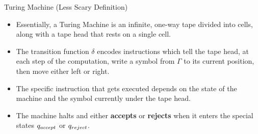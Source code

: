 \documentclass[c]{beamer}
\begin{document}

  

\begin{frame}{Turing Machine (Less Scary Definition)}
  
  \begin{itemize}
  \item Essentially, a Turing Machine is an infinite, one-way tape
    divided into cells, along with a tape head that rests on a
    single cell. \pause  
  \item The transition function $\delta$ encodes instructions
    which tell the tape head, at each step of the computation,
    write a symbol from $\Gamma$ to its current position, then
    move either left or right. \pause
  \item The specific instruction that gets executed depends on the
    state of the machine and the symbol currently under the tape
    head.\pause
  \item The machine halts and either \textbf{accepts} or
    \textbf{rejects} when it enters the special states $q_{accept}$ or
    $q_{reject}$.

  \end{itemize}
\end{frame}

    
\end{document}
